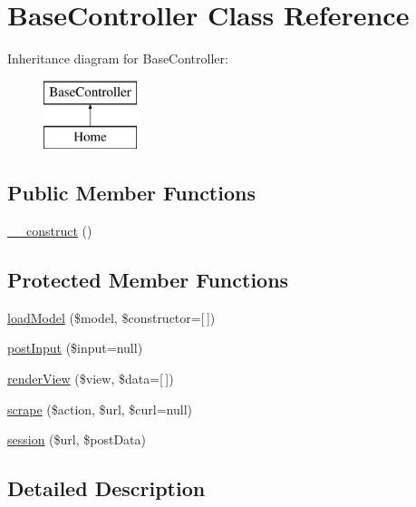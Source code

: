 \hypertarget{class_base_controller}{}\section{Base\+Controller Class Reference}
\label{class_base_controller}
Inheritance diagram for Base\+Controller\+:\begin{figure}[H]
\begin{center}
\leavevmode
\includegraphics[height=2.000000cm]{class_base_controller}
\end{center}
\end{figure}
\subsection*{Public Member Functions}
\begin{DoxyCompactItemize}
\item 
\hyperlink{class_base_controller_a095c5d389db211932136b53f25f39685}{\+\_\+\+\_\+construct} ()
\end{DoxyCompactItemize}
\subsection*{Protected Member Functions}
\begin{DoxyCompactItemize}
\item 
\hyperlink{class_base_controller_a5fa8890bd3a9d20f5c0cc2377dc49eb1}{load\+Model} (\$model, \$constructor=\mbox{[}$\,$\mbox{]})
\item 
\hyperlink{class_base_controller_a170629218b28c1759a89c4978b9323b3}{post\+Input} (\$input=null)
\item 
\hyperlink{class_base_controller_aa0c49b95cd8e5ff8ff61b4a2c35bf1eb}{render\+View} (\$view, \$data=\mbox{[}$\,$\mbox{]})
\item 
\hyperlink{class_base_controller_abd4f25604b09a96c254491df97612cc3}{scrape} (\$action, \$url, \$curl=null)
\item 
\hyperlink{class_base_controller_a259a554926fc05640c8c711c340cdeac}{session} (\$url, \$post\+Data)
\end{DoxyCompactItemize}


\subsection{Detailed Description}


